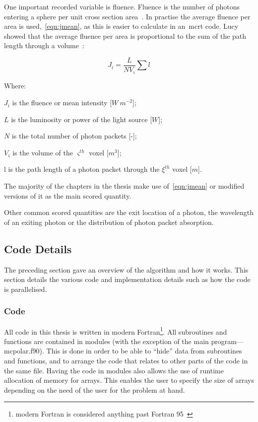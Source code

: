 One important recorded variable is fluence.
Fluence is the number of photons entering a sphere per unit cross section area~\cite{rogers1990monte}.
In practise the average fluence per area is used,~\cref{eqn:jmean}, as this is easier to calculate in an~\gls*{mcrt} code.
Lucy showed that the average fluence per area is proportional to the sum of the path length through a volume~\cite{lucy1999computing}:

\begin{equation}
J_i = \frac{L}{NV_{\varsigma}}\sum l 
\label{eqn:jmean}
\end{equation}

\noindent Where:

\indent $J_i$ is the fluence or mean intensity [$W\ m^{-2}$];

\indent $L$ is the luminosity or power of the light source [$W$];

\indent $N$ is the total number of photon packets [-];

\indent $V_{\varsigma}$ is the volume of the $\varsigma^{th}$ voxel [$m^3$];

\indent l is the path length of a photon packet through the $\xi^{th}$ voxel [$m$]. 

\medskip

The majority of the chapters in the thesis make use of~\cref{eqn:jmean} or modified versions of it as the main scored quantity.

Other common scored quantities are the exit location of a photon, the wavelength of an exiting photon or the distribution of photon packet absorption.

\subsection{Code Details}

The preceding section gave an overview of the algorithm and how it works.
This section details the various code and implementation details such as how the code is parallelised.

\subsubsection*{Code}

All code in this thesis is written in modern Fortran\footnote{modern Fortran is considered anything past Fortran 95~\cite{metcalf2011modern}}.
All subroutines and functions are contained in modules (with the exception of the main program---mcpolar.f90).
This is done in order to be able to ``hide'' data from subroutines and functions, and to arrange the code that relates to other parts of the code in the same file.
Having the code in modules also allows the use of runtime allocation of memory for arrays.
This enables the user to specify the size of arrays depending on the need of the user for the problem at hand.

